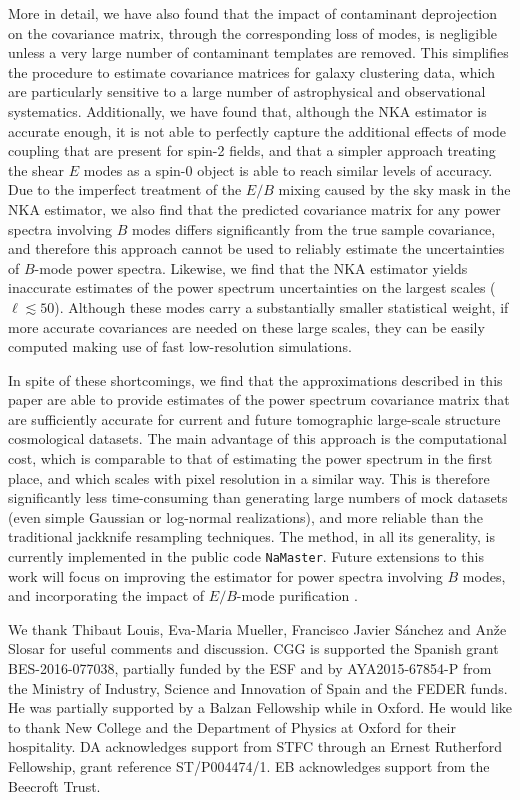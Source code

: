 \documentclass[a4paper,11pt]{article}
\begin{document}
    More in detail, we have also found that the impact of contaminant deprojection on the covariance matrix, through the corresponding loss of modes, is negligible unless a very large number of contaminant templates are removed. This simplifies the procedure to estimate covariance matrices for galaxy clustering data, which are particularly sensitive to a large number of astrophysical and observational systematics. Additionally, we have found that, although the NKA estimator is accurate enough, it is not able to perfectly capture the additional effects of mode coupling that are present for spin-2 fields, and that a simpler approach treating the shear $E$ modes as a spin-0 object is able to reach similar levels of accuracy. Due to the imperfect treatment of the $E/B$ mixing caused by the sky mask in the NKA estimator, we also find that the predicted covariance matrix for any power spectra involving $B$ modes differs significantly from the true sample covariance, and therefore this approach cannot be used to reliably estimate the uncertainties of $B$-mode power spectra. Likewise, we find that the NKA estimator yields inaccurate estimates of the power spectrum uncertainties on the largest scales ($\ell\lesssim50$). Although these modes carry a substantially smaller statistical weight, if more accurate covariances are needed on these large scales, they can be easily computed making use of fast low-resolution simulations.
    
    In spite of these shortcomings, we find that the approximations described in this paper are able to provide estimates of the power spectrum covariance matrix that are sufficiently accurate for current and future tomographic large-scale structure cosmological datasets. The main advantage of this approach is the computational cost, which is comparable to that of estimating the power spectrum in the first place, and which scales with pixel resolution in a similar way. This is therefore significantly less time-consuming than generating large numbers of mock datasets (even simple Gaussian or log-normal realizations), and more reliable than the traditional jackknife resampling techniques. The method, in all its generality, is currently implemented in the public code {\tt NaMaster}. Future extensions to this work will focus on improving the estimator for power spectra involving $B$ modes, and incorporating the impact of $E/B$-mode purification \cite{2002PhRvD..65b3505L,2003PhRvD..67b3501B,2006PhRvD..74h3002S}.
    
  \acknowledgments
  We thank Thibaut Louis, Eva-Maria Mueller, Francisco Javier S\'anchez and An\v ze Slosar for useful comments and discussion. CGG is supported the Spanish grant BES-2016-077038, partially funded by the ESF and by AYA2015-67854-P from the Ministry of Industry, Science and Innovation of Spain and the FEDER funds. He was partially supported by a Balzan Fellowship while in Oxford. He would like to thank New College and the Department of Physics at Oxford for their hospitality. DA acknowledges support from STFC through an Ernest Rutherford Fellowship, grant reference ST/P004474/1. EB acknowledges support from the Beecroft Trust.
  
\end{document}
